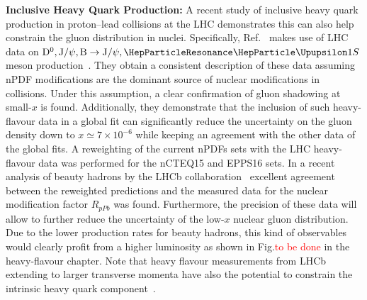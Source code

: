 \documentclass[../report.tex]{subfiles}
\begin{document}
\noindent\textbf{Inclusive Heavy Quark Production:} 
%
A recent study of  inclusive heavy quark
production in proton--lead collisions at the LHC 
demonstrates this can also help constrain  the gluon distribution in nuclei.
%
Specifically, Ref.~\cite{Kusina:2018pbp} makes use  of LHC \pPb data on 
$\mathrm{D}^0, \mathrm{J/}\psi, \mathrm{B}\to \mathrm{J/}\psi,   \PGUP{1S}$ meson production~\cite{Abelev:2014hha,Adam:2016ich,Aaij:2017gcy,Adam:2015iga,Aaboud:2017cif,Abelev:2013yxa,Aaij:2013zxa,Aaij:2017cqq,LHCb:2018jln,Abelev:2014oea,TheATLAScollaboration:2015zdl,Aaij:2014mza,ATLAS:2017dgr,Sirunyan:2018sav,Sirunyan:2018pse,Aaij:2018ogq,Aaij:2018iyy}.
%
They obtain a consistent description of these data assuming nPDF
modifications are the dominant source of nuclear modifications in \pPb
collisions. Under this assumption, a clear confirmation of gluon
shadowing at small-$x$ is found.  Additionally, they demonstrate that
the inclusion of such heavy-flavour data in a global fit can
significantly reduce the uncertainty on the gluon density down to
$x\simeq 7 \times 10^{-6}$ while keeping an agreement with the other
data of the global fits.  A reweighting of the current nPDFs sets with
the LHC heavy-flavour data was performed for the nCTEQ15 and EPPS16
sets.  In a recent analysis of beauty hadrons by the LHCb
collaboration~\cite{Aaij:2013zxa,Aaij:2017cqq,LHCb:2018jln} excellent agreement between the reweighted
predictions and the measured data for the nuclear modification factor
$R_{pPb}$ was found. Furthermore, the precision of these data will
allow to further reduce the uncertainty of the low-$x$ nuclear gluon
distribution. Due to the lower production rates for beauty hadrons,
this kind of observables would clearly profit from a higher
luminosity as shown in Fig.\textcolor{red}{to be done} in the heavy-flavour chapter.  Note that heavy flavour measurements from LHCb extending
to larger transverse momenta have also the potential to constrain the
intrinsic heavy quark component~\cite{Kniehl:2009ar,Brodsky:2015fna,Lyonnet:2015dca}.
%
\end{document}
